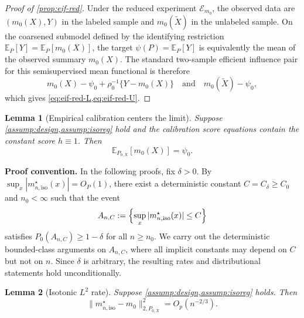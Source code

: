 \documentclass{article}
\theoremstyle{plain}
\newtheorem{lemma}{Lemma}
\theoremstyle{definition}
\newcommand{\E}{\mathbb{E}}
\newcommand{\1}{\mathbbm{1}}
\newcommand{\rhozero}{\rho_0}
\newcommand{\Px}{P_{0,X}}
\begin{document}
\begin{proof}[Proof of \cref{prop:eif-red}]
Under the reduced experiment \(\mathcal E_{m_0}\), the observed data are \((m_0(X),Y)\) in the labeled sample and \(m_0(\widetilde X)\) in the unlabeled sample. On the coarsened submodel defined by the identifying restriction \(\E_P[Y]=\E_P[m_0(X)]\), the target \(\psi(P)=\E_P[Y]\) is equivalently the mean of the observed summary \(m_0(X)\). The standard two-sample efficient influence pair for this semisupervised mean functional is therefore
\[
m_0(X)-\psi_0+\rhozero^{-1}\{Y-m_0(X)\}
\quad\text{and}\quad
m_0(\widetilde X)-\psi_0,
\]
which gives \cref{eq:eif-red-L,eq:eif-red-U}.
\end{proof}

\begin{lemma}[Empirical calibration centers the limit]
\label{lem:center}
Suppose \cref{assump:design,assump:isoreg} hold and the calibration score equations contain the constant score \(h\equiv 1\). Then
\[
\E_{\Px}[m_0(X)]=\psi_0.
\]
\end{lemma}

\textbf{Proof convention.} In the following proofs, fix \(\delta>0\). By \(\sup_x |m_{n,\mathrm{iso}}^\star(x)|=O_P(1)\), there exist a deterministic constant \(C=C_\delta\ge C_0\) and \(n_0<\infty\) such that the event
\[
A_{n,C}:=\Bigl\{\sup_x |m_{n,\mathrm{iso}}^\star(x)|\le C\Bigr\}
\]
satisfies \(P_0(A_{n,C})\ge 1-\delta\) for all \(n\ge n_0\). We carry out the deterministic bounded-class arguments on \(A_{n,C}\), where all implicit constants may depend on \(C\) but not on \(n\). Since \(\delta\) is arbitrary, the resulting rates and distributional statements hold unconditionally.


\begin{lemma}[Isotonic \(L^2\) rate]
\label{lem:isorate}
Suppose \cref{assump:design,assump:isoreg} holds. Then
\[
\|m_{n,\mathrm{iso}}^\star-m_0\|_{2,\Px}^2=O_p(n^{-2/3}).
\]
\end{lemma}
\end{document}
